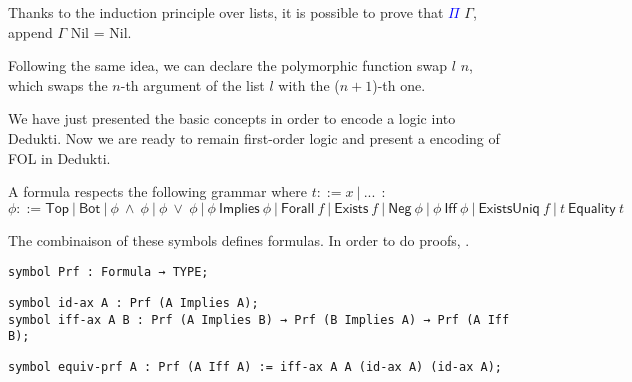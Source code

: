 \documentclass{article}
\begin{document}
	\noindent Thanks to the induction principle over lists, it is possible to prove that \textcolor{blue}{$\Pi$} $\Gamma$, \textsf{append} $\Gamma$ \textsf{Nil} = \textsf{Nil}.
	
	
	
	
	\noindent Following the same idea, we can declare the polymorphic function \textsf{swap} $l$ $n$, which swaps the $n$-th argument of the list $l$ with the ($n+1$)-th one.
	
	
	
	
	We have just presented the basic concepts in order to encode a logic into Dedukti. Now we are ready to remain first-order logic and present a encoding of FOL in Dedukti.
	
\newpage

	A formula respects the following grammar where $t ::= x~|~...~~$: \\
	$\phi ::= \textsf{Top}~|~\textsf{Bot}~|~\phi~\land~\phi~|~\phi~\lor~\phi~|~\phi~\textsf{Implies}~\phi~|~\textsf{Forall}~f~|~\textsf{Exists}~f~|~\textsf{Neg}~\phi~|~\phi~\textsf{Iff}~\phi~|~\textsf{ExistsUniq}~f~|~t~\textsf{Equality}~t$
	
	
	
	
	
	The combinaison of these symbols defines formulas.
	In order to do proofs, .
	
	\begin{lstlisting}[language=Dialekto, firstnumber=last]
symbol Prf : Formula → TYPE;
	\end{lstlisting}
	
	\begin{lstlisting}[language=Dialekto, firstnumber=last]
symbol id-ax A : Prf (A Implies A);
symbol iff-ax A B : Prf (A Implies B) → Prf (B Implies A) → Prf (A Iff B);
	\end{lstlisting}
	
	
	\begin{lstlisting}[language=Dialekto, firstnumber=last]
symbol equiv-prf A : Prf (A Iff A) := iff-ax A A (id-ax A) (id-ax A);
	\end{lstlisting}
\end{document}
